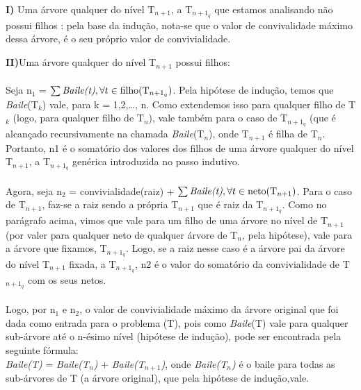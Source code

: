 \documentclass[a4paper]{article}
\begin{document}
\textbf{I)} Uma árvore qualquer do nível T$_{n+1}$, a T$_{n+1_q}$ que estamos analisando não possui filhos : pela base da indução, nota-se que o valor de convivalidade máximo dessa árvore, é o seu próprio valor de convivialidade.

\textbf{II)}Uma árvore qualquer do nível T$_{n+1}$ possui filhos:
\paragraph{}Seja n$_1$ = $\sum \text{\emph{Baile(t)}}, \forall t \in \text{filho(T$_{n+1_q}$)}$. Pela hipótese de indução, temos que \emph{Baile}(T$_k$) vale, para k = 1,2,\ldots, n. Como extendemos isso para qualquer filho de T$_k$ (logo, para qualquer filho de T$_n$), vale também para o caso de T$_{n+1_q}$ (que é alcançado recursivamente na chamada \emph{Baile}(T$_n$), onde T$_{n+1}$ é filha de T$_n$.  Portanto, n1 é o somatório dos valores dos filhos de uma árvore qualquer do nível T$_{n+1}$, a T$_{n+1_q}$ genérica introduzida no passo indutivo.

\paragraph{}Agora, seja n$_2$ = convivialidade(raiz) + $\sum \text{\emph{Baile(t)}}, \forall t \in \text{neto(T$_{n+1}$)}$. Para o caso de T$_{n+1}$, faz-se a raiz sendo a própria T$_{n+1}$ que é raiz da T$_{n+1_q}$. Como no parágrafo acima, vimos que vale para um filho de uma árvore no nível de T$_{n+1}$ (por valer para qualquer neto de qualquer árvore de T$_{n}$, pela hipótese), vale para a árvore que fixamos, T$_{n+1_q}$. Logo, se a raiz nesse caso é a árvore pai da árvore do nível T$_{n+1}$ fixada, a T$_{n+1_q}$, n2 é o valor do somatório da convivialidade de T$_{n+1_q}$ com os seus netos.\\
 
\paragraph{}Logo, por n$_1$ e n$_2$, o valor de convivialidade máximo da árvore original que foi dada como entrada para o problema (T), pois como \emph{Baile}(T) vale para qualquer sub-árvore até o n-ésimo nível (hipótese de indução), pode ser encontrada pela seguinte fórmula:\\
\emph{Baile(T)} = \emph{Baile(T$_n$)} + \emph{Baile(T$_{n+1}$)}, onde \emph{Baile(T$_n$)} é o baile para todas as sub-árvores de T (a árvore original), que pela hipótese de indução,vale.\\
\end{document}
